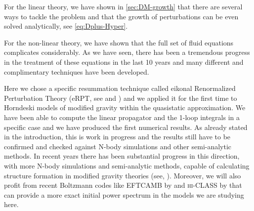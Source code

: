For the linear theory, we have shown in \cref{sec:DM-growth} that there are several
ways to tackle the problem and that the growth of perturbations can be even solved analytically, see
\cref{eq:Dplus-Hyper}.

For the non-linear theory, we have shown that the full set of fluid equations complicates considerably.
As we have seen, there has been a tremendous progress in the treatment of these equations in the last 10 years and many different
and complimentary techniques have been developed.

Here we chose a specific resummation technique called eikonal Renormalized Perturbation Theory (eRPT, see \cite{anselmi_nonlinear_2012} and
) and we applied it for the first time 
to Horndeski models of modified gravity within the quasistatic approximation.
We have been able to compute the linear propagator and the 1-loop integrals in a specific case and we have 
produced the first numerical results. As already stated in the introduction, this is work in progress and the results
still have to be confirmed and checked against N-body simulations and other semi-analytic methods.
In recent years there has been substantial progress in this direction, with more N-body simulations and semi-analytic
methods, capable of calculating structure formation in modified gravity theories (see, ).
Moreover, we will also profit from recent Boltzmann codes like \textsc{EFTCAMB} by \cite{hu_eftcamb/eftcosmomc:_2014-1} and 
\textsc{hi-CLASS} by \cite{zumalacarregui} that can provide a more exact initial power spectrum in the models
we are studying here.





